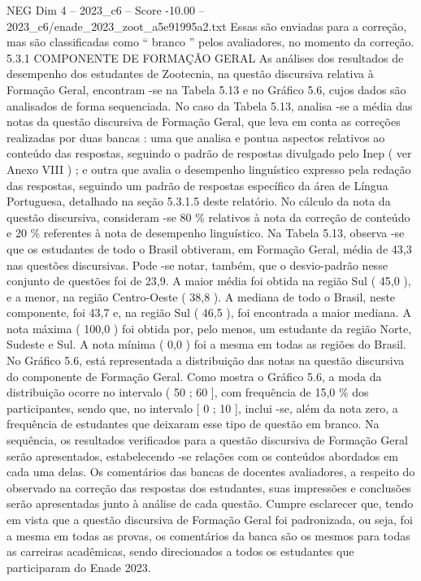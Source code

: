 \begin{textsample}{NEG Dim 4 – 2023\_c6 – Score -10.00 – 2023\_c6/enade\_2023\_zoot\_a5e91995a2.txt}
Essas são enviadas para a correção, mas são classificadas como “ branco ” pelos avaliadores, no momento da correção. 5.3.1 COMPONENTE DE FORMAÇÃO GERAL As análises dos resultados de desempenho dos estudantes de Zootecnia, na questão discursiva relativa à Formação Geral, encontram -se na Tabela 5.13 e no Gráfico 5.6, cujos dados são analisados de forma sequenciada.
No caso da Tabela 5.13, analisa -se a média das notas da questão discursiva de Formação Geral, que leva em conta as correções realizadas por duas bancas : uma que analisa e pontua aspectos relativos ao conteúdo das respostas, seguindo o padrão de respostas divulgado pelo Inep ( ver Anexo VIII ) ; e outra que avalia o desempenho linguístico expresso pela redação das respostas, seguindo um padrão de respostas específico da área de Língua Portuguesa, detalhado na seção 5.3.1.5 deste relatório.
No cálculo da nota da questão discursiva, consideram -se 80 \% relativos à nota da correção de conteúdo e 20 \% referentes à nota de desempenho linguístico.
Na Tabela 5.13, observa -se que os estudantes de todo o Brasil obtiveram, em Formação Geral, média de 43,3 nas questões discursivas.
Pode -se notar, também, que o desvio-padrão nesse conjunto de questões foi de 23,9.
A maior média foi obtida na região Sul ( 45,0 ), e a menor, na região Centro-Oeste ( 38,8 ).
A mediana de todo o Brasil, neste componente, foi 43,7 e, na região Sul ( 46,5 ), foi encontrada a maior mediana.
A nota máxima ( 100,0 ) foi obtida por, pelo menos, um estudante da região Norte, Sudeste e Sul.
A nota mínima ( 0,0 ) foi a mesma em todas as regiões do Brasil.
No Gráfico 5.6, está representada a distribuição das notas na questão discursiva do componente de Formação Geral.
Como mostra o Gráfico 5.6, a moda da distribuição ocorre no intervalo ( 50 ; 60 ], com frequência de 15,0 \% dos participantes, sendo que, no intervalo [ 0 ; 10 ], inclui -se, além da nota zero, a frequência de estudantes que deixaram esse tipo de questão em branco.
Na sequência, os resultados verificados para a questão discursiva de Formação Geral serão apresentados, estabelecendo -se relações com os conteúdos abordados em cada uma delas.
Os comentários das bancas de docentes avaliadores, a respeito do observado na correção das respostas dos estudantes, suas impressões e conclusões serão apresentadas junto à análise de cada questão.
Cumpre esclarecer que, tendo em vista que a questão discursiva de Formação Geral foi padronizada, ou seja, foi a mesma em todas as provas, os comentários da banca são os mesmos para todas as carreiras acadêmicas, sendo direcionados a todos os estudantes que participaram do Enade 2023.

\end{textsample}
